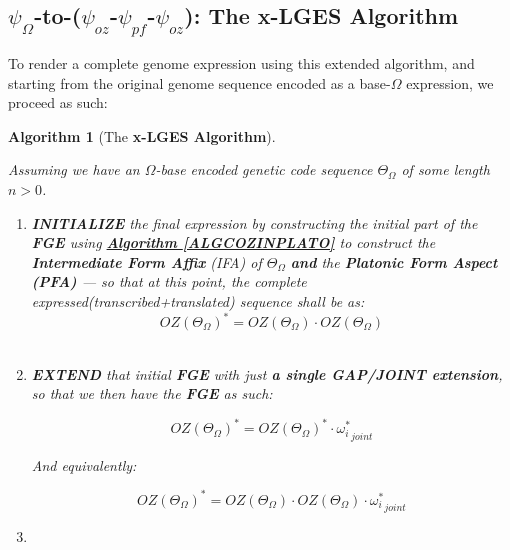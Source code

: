 \documentclass[a4paper, 18pt]{book} %
\newtheorem{alg}{Algorithm}
\begin{document}
\subsection{$\psi_{\Omega}$-to-($\psi_{oz}$-$\psi_{pf}$-$\psi_{oz}$): The x-LGES Algorithm}
\label{SECGENSEQEXPRESEXT}


To render a complete genome expression using this extended algorithm, and starting from the original genome sequence encoded as a base-$\Omega$ expression, we proceed as such: 

\begin{alg}[The \textbf{x-LGES Algorithm}]
\label{ALGCOZINPLATOEXT}

Assuming we have an $\Omega$-base encoded genetic code sequence $\Theta_\Omega$ of some length $n > 0$.

\begin{enumerate}
\item{\textbf{INITIALIZE} the final expression by constructing the initial part of the \textbf{FGE} using \textbf{\hyperref[ALGCOZINPLATO]{Algorithm \ref{ALGCOZINPLATO}}} to construct the \textbf{Intermediate Form Affix} (IFA) of $\Theta_\Omega$ \textbf{and} the \textbf{Platonic Form Aspect (PFA)} --- so that at this point, the complete expressed(transcribed+translated) sequence shall be as:\\

\begin{equation}
\label{EQTRANSLGENSEQEXT}
\boxed{OZ(\Theta_\Omega)}^* = OZ(\Theta_\Omega)\cdot\boxed{OZ(\Theta_\Omega)}
\end{equation}\\

}
\item {
\textbf{EXTEND} that initial \textbf{FGE} with just \textbf{a single GAP/JOINT extension}, so that we then have the \textbf{FGE} as such:

		\begin{equation}
		\label{EQEXTFGEJOINTEXT}
		\boxed{OZ(\Theta_\Omega)}^* = \boxed{OZ(\Theta_\Omega)}^* \cdot \boxed{\omega_i^*}_{joint}
		\end{equation}		
		
		And equivalently:
		
		\begin{equation}
		\label{EQEXTFGEJOINTSUFEXT}
		\boxed{OZ(\Theta_\Omega)}^* = OZ(\Theta_\Omega)\cdot\boxed{OZ(\Theta_\Omega)} \cdot \boxed{\omega_i^*}_{joint}
		\end{equation}				

}
\item {

}
\end{enumerate}
\end{alg}
\end{document}
